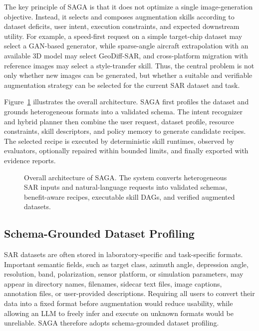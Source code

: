 The key principle of SAGA is that it does not optimize a single image-generation objective.
Instead, it selects and composes augmentation skills according to dataset deficits, user intent, execution constraints, and expected downstream utility.
For example, a speed-first request on a simple target-chip dataset may select a GAN-based generator, while sparse-angle aircraft extrapolation with an available 3D model may select GeoDiff-SAR, and cross-platform migration with reference images may select a style-transfer skill.
Thus, the central problem is not only whether new images can be generated, but whether a suitable and verifiable augmentation strategy can be selected for the current SAR dataset and task.

Figure~\ref{fig:saga_overview} illustrates the overall architecture.
SAGA first profiles the dataset and grounds heterogeneous formats into a validated schema.
The intent recognizer and hybrid planner then combine the user request, dataset profile, resource constraints, skill descriptors, and policy memory to generate candidate recipes.
The selected recipe is executed by deterministic skill runtimes, observed by evaluators, optionally repaired within bounded limits, and finally exported with evidence reports.

\begin{figure}[t]
    \centering
    \caption{Overall architecture of SAGA. The system converts heterogeneous SAR inputs and natural-language requests into validated schemas, benefit-aware recipes, executable skill DAGs, and verified augmented datasets.}
    \label{fig:saga_overview}
\end{figure}

\subsection{Schema-Grounded Dataset Profiling}
\label{subsec:schema_profiling}

SAR datasets are often stored in laboratory-specific and task-specific formats.
Important semantic fields, such as target class, azimuth angle, depression angle, resolution, band, polarization, sensor platform, or simulation parameters, may appear in directory names, filenames, sidecar text files, image captions, annotation files, or user-provided descriptions.
Requiring all users to convert their data into a fixed format before augmentation would reduce usability, while allowing an LLM to freely infer and execute on unknown formats would be unreliable.
SAGA therefore adopts schema-grounded dataset profiling.

